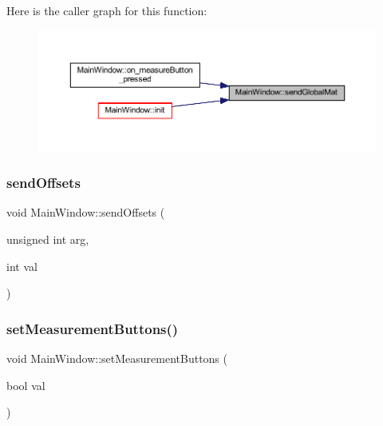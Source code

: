 Here is the caller graph for this function\+:
\nopagebreak
\begin{figure}[H]
\begin{center}
\leavevmode
\includegraphics[width=350pt]{classMainWindow_a302481f26ce2f1666e4a4dfaddacb08e_icgraph}
\end{center}
\end{figure}
\mbox{\label{classMainWindow_ab46a8e562fc57b9581b90328e0872a67}} 
\subsubsection{\texorpdfstring{sendOffsets}{sendOffsets}}
{\footnotesize\ttfamily void Main\+Window\+::send\+Offsets (\begin{DoxyParamCaption}\item[{unsigned int}]{arg,  }\item[{int}]{val }\end{DoxyParamCaption})\hspace{0.3cm}{\ttfamily [signal]}}

\mbox{\label{classMainWindow_aa6af159870a097c8347efae3a7c26e6f}} 
\subsubsection{\texorpdfstring{setMeasurementButtons()}{setMeasurementButtons()}}
{\footnotesize\ttfamily void Main\+Window\+::set\+Measurement\+Buttons (\begin{DoxyParamCaption}\item[{bool}]{val }\end{DoxyParamCaption})\hspace{0.3cm}{\ttfamily [private]}}



